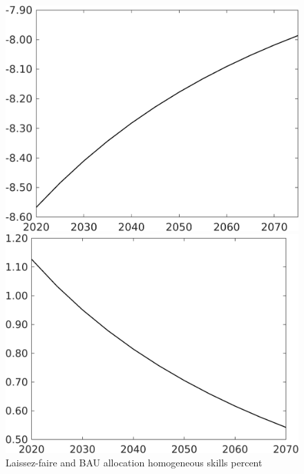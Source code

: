 \begin{figure}[h!!]
	\centering
	\caption{Laissez-faire and BAU allocation homogeneous skills percent }\label{fig:LF_BAU_nsk1_per}
	\begin{minipage}[]{0.32\textwidth}
		\includegraphics[width=1\textwidth]{../../codding_model/own_basedOnFried/optimalPol_010922_revision/figures/all_13Sept22/CompTaul_LFBAUPer_Reg0_Emnet_spillover0_nsk1_xgr0_sep1_countec0_GovRev1_etaa0.79.png}
	\end{minipage}	
	\begin{minipage}[]{0.32\textwidth}
		\includegraphics[width=1\textwidth]{../../codding_model/own_basedOnFried/optimalPol_010922_revision/figures/all_13Sept22/CompTaul_LFBAUPer_Reg0_gAagg_spillover0_nsk1_xgr0_sep1_countec0_GovRev1_etaa0.79.png}

\end{minipage}
\end{figure}
